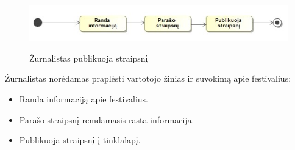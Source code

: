 \documentclass{VUMIFPSkursinis}
\begin{document}
\begin{figure}[H]
    \centering
    \includegraphics[scale=0.7]{img/geri/zurnalistas}
    \label{img:uml17}
	\caption{Žurnalistas publikuoja straipsnį}
\end{figure}

Žurnalistas norėdamas praplėsti vartotojo žinias ir suvokimą apie festivalius:
\begin{itemize}
\item Randa informaciją apie festivalius.
\item Parašo straipsnį remdamasis rasta informacija.
\item Publikuoja straipsnį į tinklalapį.
\end{itemize}
\end{document}
